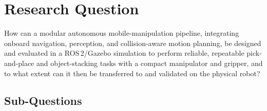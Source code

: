 \documentclass[11pt,a4paper]{article}
\begin{document}
\section{Research Question}

\begin{tcolorbox}[colback=boxbg, colframe=primary, arc=3pt, boxrule=1pt,
    left=1em, right=1em, top=1em, bottom=1em]
How can a modular autonomous mobile-manipulation pipeline, integrating onboard
navigation, perception, and collision-aware motion planning, be designed and evaluated
in a ROS\,2/Gazebo simulation to perform reliable, repeatable pick-and-place and
object-stacking tasks with a compact manipulator and gripper, and to what extent can
it then be transferred to and validated on the physical robot?
\end{tcolorbox}

\subsection{Sub-Questions}
\end{document}
